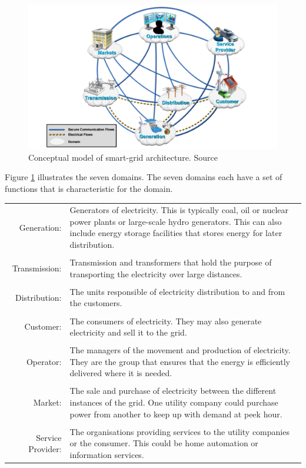 \newpage %

\begin{figure}[H]
\centering
\includegraphics[width=1\textwidth]{billeder/SMARTGRID.png}
\caption{Conceptual model of smart-grid architecture. Source }
\label{fig:CMOSG}
\end{figure}
 
Figure \ref{fig:CMOSG} illustrates the seven domains. The seven domains each have a set of functions that is characteristic for the domain.  
 
\begin{tabularx}{\linewidth}{ r X }
Generation:& Generators of electricity. This is typically coal, oil or nuclear power plants or large-scale hydro generators. This can also include energy storage facilities that stores energy for later distribution. \\\\

Transmission:& Transmission and transformers that hold the purpose of transporting the electricity over large distances. \\\\

Distribution:& The units responsible of electricity distribution to and from the customers. \\\\

Customer:& The consumers of electricity. They may also generate electricity and sell it to the grid. \\\\

Operator:& The managers of the movement and production of electricity. They are the group that ensures that the energy is efficiently delivered where it is needed. \\\\
Market:& The sale and purchase of electricity between the different instances of the grid. One utility company could purchase power from another to keep up with demand at peek hour. \\\\
Service Provider:& The organisations providing services to the utility companies or the consumer. This could be home automation or information services.  \\
\end{tabularx}

